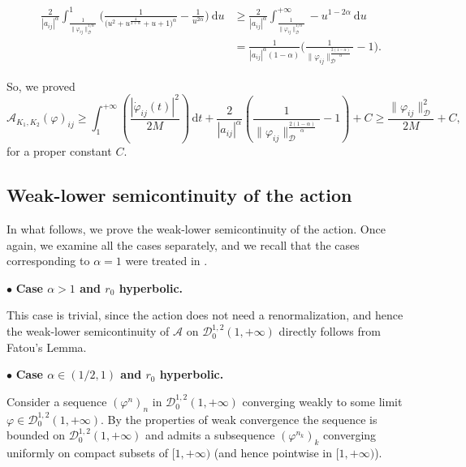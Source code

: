\documentclass[a4paper,10pt]{amsart}
\newcommand{\ud}{\mathrm{d}}
\theoremstyle{plain}
\theoremstyle{definition}
\numberwithin{equation}{section}
\numberwithin{thm}{section}
\begin{document}
\[
\begin{split}
\frac{2}{|a_{ij}|^{\alpha}}\int_{\frac{1}{\|\varphi_{ij}\|_\mathcal{D}^{1/\alpha}}}^{1} \bigg(\frac{1}{\big(u^2 + u^{\frac{4}{2+\alpha}}+u+1\big)^\alpha}-\frac{1}{u^{2\alpha}}\bigg)\ \ud u & \ge \frac{2}{|a_{ij}|^\alpha} \int_{\frac{1}{\|\varphi_{ij}\|_\mathcal{D}^{1/\alpha}}}^{+\infty} -u^{1-2\alpha}\ \ud u\\
& = \frac{1}{|a_{ij}|^\alpha(1-\alpha)}\bigg(\frac{1}{\|\varphi_{ij}\|_\mathcal{D}^{\frac{2(1-\alpha)}{\alpha}}}-1\bigg).
\end{split}
\]

So, we proved
\[
\mathcal{A}_{K_1,K_2}(\varphi)_{ij} \ge \int_{1}^{+\infty}\left(\frac{|\dot\varphi_{ij}(t)|^2}{2M}\right)\,\ud t + \frac{2}{|a_{ij}|^\alpha}\left( \frac{1}{\|\varphi_{ij}\|_\mathcal{D}^{\frac{2(1-\alpha)}{\alpha}}}-1\right) + C \ge \frac{\|\varphi_{ij}\|_{\mathcal{D}}^2}{2M}+C,
\]
for a proper constant $C$.








\subsection{Weak-lower semicontinuity of the action}\label{sec:wlsc}

In what follows, we prove the weak-lower semicontinuity of the action. Once again, we examine all the cases separately, and we recall that the cases corresponding to $\alpha=1$ were treated in \cite{PolimeniTerracini}.

\noindent $\bullet$ {\bf Case $\alpha >1$ and $r_0$ hyperbolic.}


This case is trivial, since the action does not need a renormalization, and hence the weak-lower semicontinuity of $\mathcal A$ on $\mathcal{D}^{1,2}_0(1,+\infty)$ directly follows from Fatou's Lemma.

\noindent $\bullet$ {\bf Case $\alpha \in (1/2,1)$ and $r_0$ hyperbolic.} 

Consider a sequence $(\varphi^n)_n$ in $\mathcal{D}_0^{1,2}(1,+\infty)$ converging weakly to some limit $\varphi\in\mathcal{D}_0^{1,2}(1,+\infty)$. By the properties of weak convergence the sequence is bounded on $\mathcal{D}_0^{1,2}(1,+\infty)$ and admits a subsequence $(\varphi^{n_k})_k$ converging uniformly on compact subsets of $[1,+\infty)$ (and hence pointwise in $[1,+\infty)$). 
\end{document}
